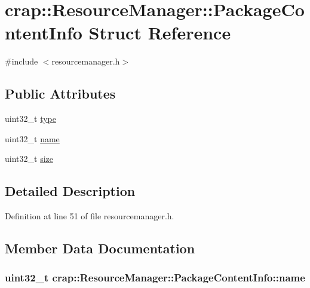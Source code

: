 \hypertarget{structcrap_1_1_resource_manager_1_1_package_content_info}{}\section{crap\+:\+:Resource\+Manager\+:\+:Package\+Content\+Info Struct Reference}
\label{structcrap_1_1_resource_manager_1_1_package_content_info}


{\ttfamily \#include $<$resourcemanager.\+h$>$}

\subsection*{Public Attributes}
\begin{DoxyCompactItemize}
\item 
uint32\+\_\+t \hyperlink{structcrap_1_1_resource_manager_1_1_package_content_info_aa44d918f7f16824c05c04466d6823c26}{type}
\item 
uint32\+\_\+t \hyperlink{structcrap_1_1_resource_manager_1_1_package_content_info_ae97a0648f2731b6b10ce81db0d809d85}{name}
\item 
uint32\+\_\+t \hyperlink{structcrap_1_1_resource_manager_1_1_package_content_info_a44623b6eae3303892db7cc79fbd1b29d}{size}
\end{DoxyCompactItemize}


\subsection{Detailed Description}


Definition at line 51 of file resourcemanager.\+h.



\subsection{Member Data Documentation}
\hypertarget{structcrap_1_1_resource_manager_1_1_package_content_info_ae97a0648f2731b6b10ce81db0d809d85}{}
\subsubsection[{name}]{\setlength{\rightskip}{0pt plus 5cm}uint32\+\_\+t crap\+::\+Resource\+Manager\+::\+Package\+Content\+Info\+::name}\label{structcrap_1_1_resource_manager_1_1_package_content_info_ae97a0648f2731b6b10ce81db0d809d85}


